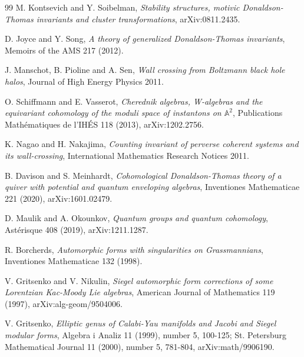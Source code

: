 \documentclass[11pt]{article}
\theoremstyle{definition}
\begin{document}
\begin{thebibliography}{99}
M. Kontsevich and Y. Soibelman, \emph{Stability structures, motivic
Donaldson-Thomas invariants and cluster transformations},
arXiv:0811.2435.

D. Joyce and Y. Song, \emph{A theory of generalized Donaldson-Thomas
invariants}, Memoirs of the AMS 217 (2012).

J. Manschot, B. Pioline and A. Sen, \emph{Wall crossing from Boltzmann
black hole halos}, Journal of High Energy Physics 2011.

O. Schiffmann and E. Vasserot, \emph{Cherednik algebras, W-algebras and
the equivariant cohomology of the moduli space of instantons on
$\mathbb A^2$}, Publications Math\'ematiques de l'IH\'ES 118 (2013),
arXiv:1202.2756.

K. Nagao and H. Nakajima, \emph{Counting invariant of perverse coherent
systems and its wall-crossing}, International Mathematics Research
Notices 2011.

B. Davison and S. Meinhardt, \emph{Cohomological Donaldson-Thomas
theory of a quiver with potential and quantum enveloping algebras},
Inventiones Mathematicae 221 (2020), arXiv:1601.02479.

D. Maulik and A. Okounkov, \emph{Quantum groups and quantum cohomology},
Ast\'erisque 408 (2019), arXiv:1211.1287.

R. Borcherds, \emph{Automorphic forms with singularities on Grassmannians},
Inventiones Mathematicae 132 (1998).

V. Gritsenko and V. Nikulin, \emph{Siegel automorphic form corrections
of some Lorentzian Kac-Moody Lie algebras}, American Journal of
Mathematics 119 (1997), arXiv:alg-geom/9504006.

V. Gritsenko, \emph{Elliptic genus of Calabi-Yau manifolds and Jacobi
and Siegel modular forms}, Algebra i Analiz 11 (1999), number 5, 100-125;
St. Petersburg Mathematical Journal 11 (2000), number 5, 781-804,
arXiv:math/9906190.
\end{thebibliography}
\end{document}
